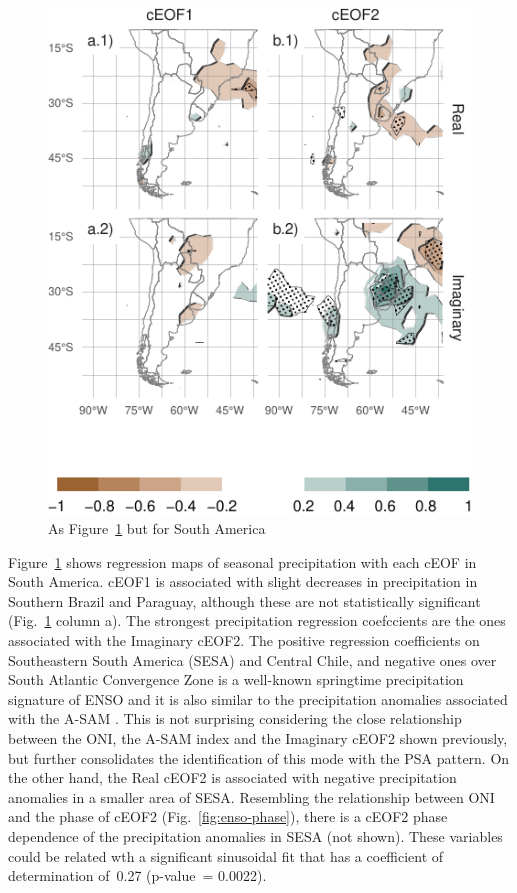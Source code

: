 \documentclass[smallextended]{svjour3}       %
\begin{document}
\begin{figure}
\centering
\includegraphics{../figures/pp-america-1.pdf}
\caption{\label{fig:pp-america}As Figure~\ref{fig:pp-america} but for South America}
\end{figure}

Figure~\ref{fig:pp-america} shows regression maps of seasonal precipitation with each cEOF in South America. cEOF1 is associated with slight decreases in precipitation in Southern Brazil and Paraguay, although these are not statistically significant (Fig.~\ref{fig:pp-america} column a). The strongest precipitation regression coefccients are the ones associated with the Imaginary cEOF2. The positive regression coefficients on Southeastern South America (SESA) and Central Chile, and negative ones over South Atlantic Convergence Zone is a well-known springtime precipitation signature of ENSO \citep{cai2020a} and it is also similar to the precipitation anomalies associated with the A-SAM \citep{campitelli2021}.
This is not surprising considering the close relationship between the ONI, the A-SAM index and the Imaginary cEOF2 shown previously, but further consolidates the identification of this mode with the PSA pattern.
On the other hand, the Real cEOF2 is associated with negative precipitation anomalies in a smaller area of SESA.
Resembling the relationship between ONI and the phase of cEOF2 (Fig.~\ref{fig:enso-phase}), there is a cEOF2 phase dependence of the precipitation anomalies in SESA (not shown).
These variables could be related wth a significant sinusoidal fit that has a coefficient of determination of~0.27 (p-value~= 0.0022).
\end{document}
